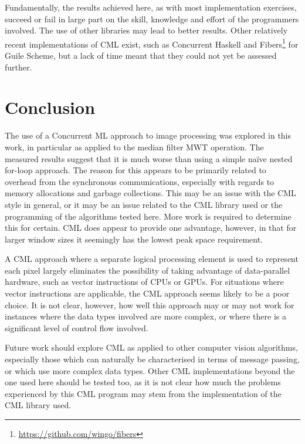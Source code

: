 Fundamentally, the results achieved here, as with most implementation exercises, succeed or fail in large part on the skill, knowledge and effort of the programmers involved.  The use of other libraries may lead to better results.  Other relatively recent implementations of CML exist, such as Concurrent Haskell \cite{Chaudhuri2009} and Fibers\footnote{\url{https://github.com/wingo/fibers}} for Guile Scheme, but a lack of time meant that they could not yet be assessed further.

\section{Conclusion}
The use of a Concurrent ML approach to image processing was explored in this work, in particular as applied to the median filter MWT operation.  The measured results suggest that it is much worse than using a simple naïve nested for-loop approach.  The reason for this appears to be primarily related to overhead from the synchronous communications, especially with regards to memory allocations and garbage collections.  This may be an issue with the CML style in general, or it may be an issue related to the CML library used or the programming of the algorithms tested here.  More work is required to determine this for certain.  CML does appear to provide one advantage, however, in that for larger window sizes it seemingly has the lowest peak space requirement.

A CML approach where a separate logical processing element is used to represent each pixel largely eliminates the possibility of taking advantage of data-parallel hardware, such as vector instructions of CPUs or GPUs.  For situations where vector instructions are applicable, the CML approach seems likely to be a poor choice.  It is not clear, however, how well this approach may or may not work for instances where the data types involved are more complex, or where there is a significant level of control flow involved.

Future work should explore CML as applied to other computer vision algorithms, especially those which can naturally be characterised in terms of message passing, or which use more complex data types.  Other CML implementations beyond the one used here should be tested too, as it is not clear how much the problems experienced by this CML program may stem from the implementation of the CML library used.